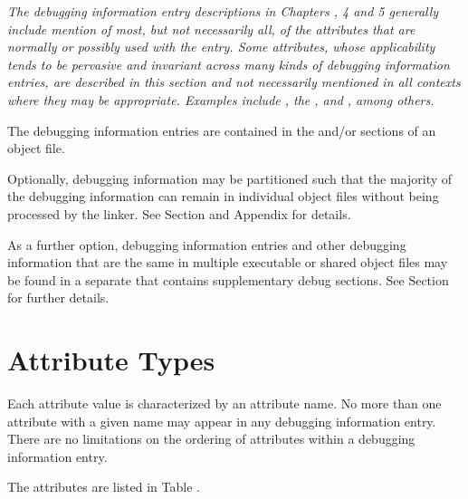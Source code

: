 \textit{The debugging information entry descriptions in
\bb
Chapters
, 4 and 5 generally include mention of
most, but not necessarily all, of the attributes 
that are normally or possibly used with the entry.
Some attributes, whose applicability tends to be 
pervasive and invariant across many kinds of
debugging information entries, are described in 
this section and not necessarily mentioned in all
contexts where they may be appropriate. 
Examples include 
\DWATartificial, 
the , and 
\DWATdescription, 
among others.}

The debugging information entries are contained in the 
\dotdebuginfo{} and/or \dotdebuginfodwo{} sections of an object file.

Optionally, debugging information may be partitioned such
that the majority of the debugging information can remain in
individual object files without being processed by the
linker. 
\bb\eb
See Section  and
Appendix  for details.

As a further option, debugging information entries and other debugging
information that are the same in multiple executable or shared object files 
may be found in a separate  that 
contains supplementary debug sections.
\bb\eb
See Section  for
further details.
 
\section{Attribute Types}
\label{chap:attributetypes}
Each attribute value is characterized by an attribute name. 
No more than one attribute with a given name may appear in any
debugging information entry. 
There are no limitations on the
ordering of attributes within a debugging information entry.

The attributes are listed in Table .  

